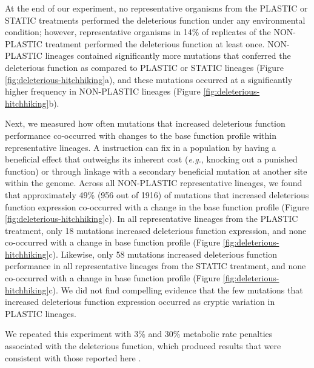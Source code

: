 \begin{raggedbottom}
At the end of our experiment, no representative organisms from the PLASTIC or STATIC treatments performed the deleterious function under any environmental condition; however, representative organisms in 14\% of replicates of the NON-PLASTIC treatment performed the deleterious function at least once.
NON-PLASTIC lineages contained significantly more mutations that conferred the deleterious function as compared to PLASTIC or STATIC lineages (Figure \ref{fig:deleterious-hitchhiking}a), and these mutations occurred at a significantly higher frequency in NON-PLASTIC lineages (Figure \ref{fig:deleterious-hitchhiking}b).

Next, we measured how often mutations that increased deleterious function performance co-occurred with changes to the base function profile within representative lineages.
A  instruction can fix in a population by having a beneficial effect that outweighs its inherent cost (\textit{e.g.}, knocking out a punished function) or through linkage with a secondary beneficial mutation at another site within the genome.
Across all NON-PLASTIC representative lineages, we found that approximately 49\% (956 out of 1916) of mutations that increased deleterious function expression co-occurred with a change in the base function profile (Figure \ref{fig:deleterious-hitchhiking}c).
In all representative lineages from the PLASTIC treatment, only 18 mutations increased deleterious function expression, and none co-occurred with a change in base function profile (Figure \ref{fig:deleterious-hitchhiking}c).
Likewise, only 58 mutations increased deleterious function performance in all representative lineages from the STATIC treatment, and none co-occurred with a change in base function profile (Figure \ref{fig:deleterious-hitchhiking}c).
We did not find compelling evidence that the few mutations that increased deleterious function expression occurred as cryptic variation in PLASTIC lineages.

We repeated this experiment with 3\% and 30\% metabolic rate penalties associated with the deleterious function, which produced results that were consistent with those reported here \citep{supplemental_material}.




\end{raggedbottom}

